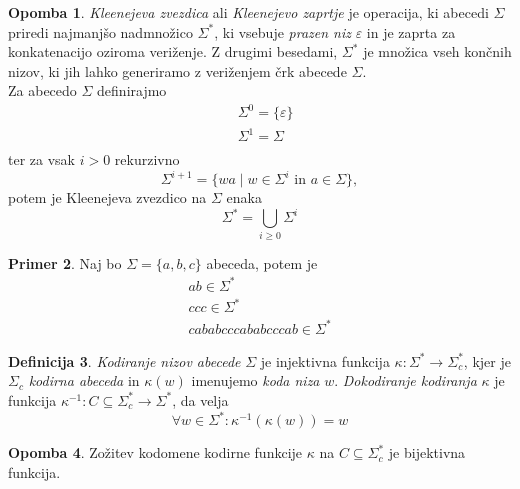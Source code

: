 \documentclass{amsart}
\theoremstyle{definition} %
\newtheorem{definicija}{Definicija}[section]
\newtheorem{primer}[definicija]{Primer}
\newtheorem{opomba}[definicija]{Opomba}
\theoremstyle{plain} %
\begin{document}
\begin{opomba}
    
    \textit{Kleenejeva zvezdica} ali \textit{Kleenejevo zaprtje} je operacija, ki
    abecedi $ \Sigma $ priredi najmanjšo nadmnožico $ \Sigma^* $, ki vsebuje
    \textit{prazen niz} $ \varepsilon $ in je zaprta za konkatenacijo oziroma veriženje.
    Z drugimi besedami, $ \Sigma^* $ je množica vseh končnih nizov, ki
    jih lahko generiramo z veriženjem črk abecede $ \Sigma $. \\
    Za abecedo $ \Sigma $ definirajmo
    \begin{align*}
        & \Sigma^0 = \{ \varepsilon \} \\
        & \Sigma^1 = \Sigma \\
    \end{align*}
    ter za vsak $ i > 0 $ rekurzivno
    \[
        \Sigma^{i+1} = \{ wa \mid w \in \Sigma^i \text{ in } a \in \Sigma \},
    \]
    potem je Kleenejeva zvezdico na $ \Sigma $ enaka
    \[
        \Sigma^* = \bigcup_{i \geq 0} \Sigma^i
    \]

\end{opomba}

\begin{primer}
    
    Naj bo $ \Sigma = \{ a,b,c \} $ abeceda, potem je
    \begin{gather*} 
        ab \in \Sigma^* \\
        ccc \in \Sigma^* \\
        cababcccababcccab \in \Sigma^*
    \end{gather*}

\end{primer}

\begin{definicija}
    
    \textit{Kodiranje nizov abecede} $ \Sigma $ je injektivna funkcija $ \kappa \colon \Sigma^* 
    \to \Sigma_c^* $, kjer je $ \Sigma_c $ \textit{kodirna abeceda} in $ \kappa(w) $ imenujemo
    \textit{koda niza} $ w $. \textit{Dokodiranje kodiranja} $ \kappa $ je funkcija 
    $ \kappa^{-1} \colon C \subseteq \Sigma^*_c \to \Sigma^* $, da velja
    \[
        \forall w \in \Sigma^* \colon \kappa^{-1}(\kappa(w)) = w
    \]

\end{definicija}

\begin{opomba}
    
    Zožitev kodomene kodirne funkcije $ \kappa $ na $ C \subseteq \Sigma^*_c $ je bijektivna funkcija.

\end{opomba}
\end{document}
